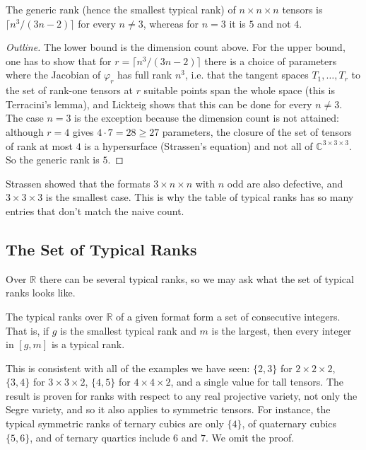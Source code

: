   \begin{theorem}[Lickteig, 1985]
    The generic rank (hence the smallest typical rank) of $n \times n \times n$ tensors is $\lceil n^3 / (3n - 2) \rceil$ for every $n \neq 3$, whereas for $n = 3$ it is $5$ and not $4$. 
  \end{theorem}
  \begin{proof}[Outline]
    The lower bound is the dimension count above. For the upper bound, one has to show that for $r = \lceil n^3 / (3n-2) \rceil$ there is a choice of parameters where the Jacobian of $\varphi_r$ has full rank $n^3$, i.e. that the tangent spaces $T_1, \ldots, T_r$ to the set of rank-one tensors at $r$ suitable points span the whole space (this is Terracini's lemma), and Lickteig shows that this can be done for every $n \neq 3$. The case $n = 3$ is the exception because the dimension count is not attained: although $r = 4$ gives $4 \cdot 7 = 28 \geq 27$ parameters, the closure of the set of tensors of rank at most $4$ is a hypersurface (Strassen's equation) and not all of $\mathbb{C}^{3 \times 3 \times 3}$. So the generic rank is $5$. 
  \end{proof}

  Strassen showed that the formats $3 \times n \times n$ with $n$ odd are also defective, and $3 \times 3 \times 3$ is the smallest case. This is why the table of typical ranks has so many entries that don't match the naive count. 

\subsection{The Set of Typical Ranks}

  Over $\mathbb{R}$ there can be several typical ranks, so we may ask what the set of typical ranks looks like. 

  \begin{theorem}
    \label{thm:consecutive-typical}
    The typical ranks over $\mathbb{R}$ of a given format form a set of consecutive integers. That is, if $g$ is the smallest typical rank and $m$ is the largest, then every integer in $[g, m]$ is a typical rank. 
  \end{theorem}

  This is consistent with all of the examples we have seen: $\{2, 3\}$ for $2 \times 2 \times 2$, $\{3, 4\}$ for $3 \times 3 \times 2$, $\{4, 5\}$ for $4 \times 4 \times 2$, and a single value for tall tensors. The result is proven for ranks with respect to any real projective variety, not only the Segre variety, and so it also applies to symmetric tensors. For instance, the typical symmetric ranks of ternary cubics are only $\{4\}$, of quaternary cubics $\{5, 6\}$, and of ternary quartics include $6$ and $7$. We omit the proof. 

